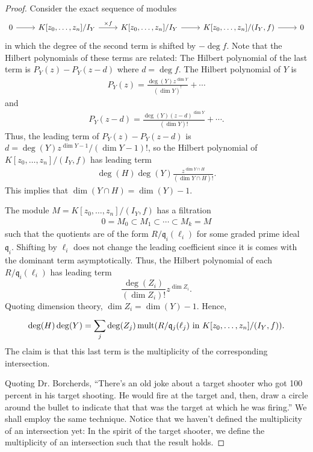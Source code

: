 \documentclass [11 pt, oneside] {article}
\begin{document}
\begin{proof}
Consider the exact sequence of modules
\[
\begin{tikzcd}
	0\ar[r] & K[z_0,\hdots,z_n] / I_Y \ar[r, "\times f"] & K[z_0,\hdots, z_n] /I_Y \ar[r] & K[z_0,\hdots, z_n]/(I_Y, f)\ar[r] &0
\end{tikzcd}
\]
in which the degree of the second term is shifted by $-\deg f$. Note that the Hilbert polynomials of these terms are related: The Hilbert polynomial of the last term is $P_Y(z) - P_Y (z-d)$ where $d=\deg f$. The Hilbert polynomial of $Y$ is
\begin{align*}
	P_Y(z) =  \frac{\deg(Y)z^{\dim Y}}{(\dim Y)^!}+\cdots
\end{align*}
and
\begin{align*}
	P_Y(z-d) =  \frac{\deg(Y) (z-d)^{\dim Y}}{(\dim Y)!}+\cdots.
\end{align*}
Thus, the leading term of $P_Y(z)-P_Y (z-d)$ is $d = \deg(Y) z^{\dim Y-1}/ (\dim Y- 1)!$, so the Hilbert polynomial of $K[z_0,\hdots,z_n]/(I_Y,f)$ has leading term
\begin{align*}
	\deg(H)\deg (Y)  \frac{z^{\dim Y\cap H}}{(\dim Y\cap H)!}.
\end{align*}
This implies that $\dim (Y\cap H) =\dim (Y)-1$. 

The module $M=K[z_0,\hdots, z_n]/(I_Y, f)$ has a filtration 
\begin{align*}
	0  = M_0\subset M_1\subset\cdots \subset M_k = M
\end{align*}
such that the quotients are of the form $R/\mathfrak{q}_i(\ell_i)$ for some graded prime ideal $\mathfrak{q}_i$. Shifting by $\ell_i$ does not change the leading coefficient since it is comes with the dominant term asymptotically. Thus, the Hilbert polynomial of each $R/\mathfrak{q}_i(\ell_i)$ has leading term
\[
	\frac{\deg (Z_i)}{(\dim Z_i)!}z^{\dim Z_i}.
\]
Quoting dimension theory, $\dim Z_i = \dim (Y)-1$. Hence, 
\begin{align*}
	\deg(H)\deg (Y) =  \sum_{j}^{} \deg(Z_j) \operatorname{mult} (R/\mathfrak{q}_j(\ell_j) \textrm{ in $K[z_0,\hdots, z_n]/(I_Y,f)$}).
\end{align*}
The claim is that this last term is the multiplicity of the corresponding intersection.

Quoting Dr. Borcherds, ``There's an old joke about a target shooter who got 100 percent in his target shooting. He would fire at the target and, then, draw a circle around the bullet to indicate that that was the target at which he was firing.'' We shall employ the same technique. Notice that we haven't defined the multiplicity of an intersection yet: In the spirit of the target shooter, we define the multiplicity of an intersection such that the result holds. 
\end{proof}
\end{document}
